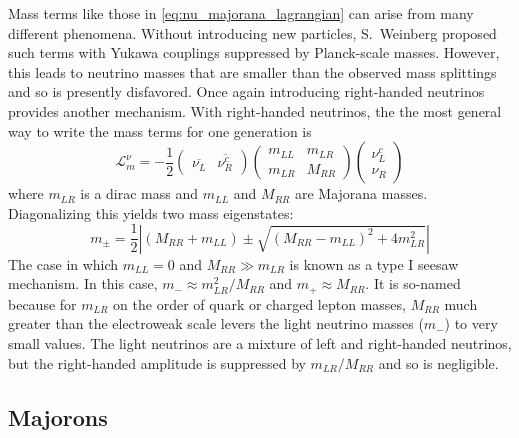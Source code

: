 \documentclass[herrin-thesis.tex]{subfiles}
\begin{document}
Mass terms like those in \cref{eq:nu_majorana_lagrangian} can arise from many different phenomena. Without introducing new particles, S.~Weinberg\cite{Weinberg:1979qa} proposed such terms with Yukawa couplings suppressed by Planck-scale masses. However, this leads to neutrino masses that are smaller than the observed mass splittings and so is presently disfavored. Once again introducing right-handed neutrinos provides another mechanism. With right-handed neutrinos, the the most general way to write the mass terms for one generation is 
\begin{equation}
\mathcal{L}_{m}^{\nu} = -\frac{1}{2}
\begin{pmatrix}
	\overline{\nu_{L}} 	&	\overline{\nu_{R}^{c}}
\end{pmatrix}
\begin{pmatrix}
	m_{L L} 		&	m_{L R}			\\
	m_{L R}		&	M_{R R}
\end{pmatrix}
\begin{pmatrix}
	\nu_{L}^{c}	\\
	\nu_{R}
\end{pmatrix}
\label{eq:nu_mass_matrix}
\end{equation}
where \(m_{L R}\) is a dirac mass and \(m_{L L}\) and \(M_{R R}\) are Majorana masses. Diagonalizing this yields two mass eigenstates:
\begin{equation}
m_{\pm} = \frac{1}{2}\left | (M_{R R} + m_{L L}) \pm \sqrt{\left(M_{R R} - m_{L L}\right)^2 + 4 m_{L R}^2}\right |
\label{eq:nu_diagonalized_masses}
\end{equation}
The case in which \(m_{L L} = 0\) and \(M_{R R}\gg m_{L R}\) is known as a type I seesaw mechanism. In this case, \(m_{-} \approx m_{L R}^2/M_{R R}\) and \(m_{+} \approx M_{R R}\). It is so-named because for \(m_{L R}\) on the order of quark or charged lepton masses, \(M_{R R}\) much greater than the electroweak scale levers the light neutrino masses (\(m_{-}\)) to very small values. The light neutrinos are a mixture of left and right-handed neutrinos, but the right-handed amplitude is suppressed by \(m_{L R}/M_{R R}\) and so is negligible.

\subsection{Majorons}
\end{document}
